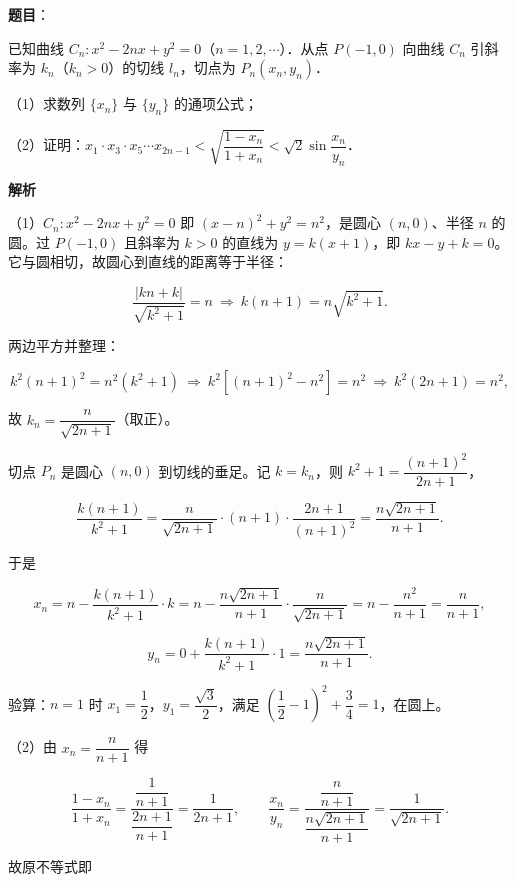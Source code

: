 \begin{answer}

\textbf{题目}：

已知曲线 $C_n:x^2-2nx+y^2=0$（$n=1,2,\cdots$）．从点 $P(-1,0)$ 向曲线 $C_n$ 引斜率为 $k_n$（$k_n>0$）的切线 $l_n$，切点为 $P_n(x_n,y_n)$．

（1）求数列 $\{x_n\}$ 与 $\{y_n\}$ 的通项公式；

（2）证明：$x_1\cdot x_3\cdot x_5\cdots x_{2n-1}<\sqrt{\dfrac{1-x_n}{1+x_n}}<\sqrt2\sin\dfrac{x_n}{y_n}$．

\textbf{解析}

（1）$C_n:x^2-2nx+y^2=0$ 即 $(x-n)^2+y^2=n^2$，是圆心 $(n,0)$、半径 $n$ 的圆。过 $P(-1,0)$ 且斜率为 $k>0$ 的直线为 $y=k(x+1)$，即 $kx-y+k=0$。它与圆相切，故圆心到直线的距离等于半径：

\nopagebreak[4]
\[\frac{|kn+k|}{\sqrt{k^2+1}}=n\ \Longrightarrow\ k(n+1)=n\sqrt{k^2+1}.\]

两边平方并整理：

\nopagebreak[4]
\[k^2(n+1)^2=n^2(k^2+1)\ \Longrightarrow\ k^2\left[(n+1)^2-n^2\right]=n^2\ \Longrightarrow\ k^2(2n+1)=n^2,\]

故 $k_n=\dfrac{n}{\sqrt{2n+1}}$（取正）。

切点 $P_n$ 是圆心 $(n,0)$ 到切线的垂足。记 $k=k_n$，则 $k^2+1=\dfrac{(n+1)^2}{2n+1}$，

\nopagebreak[4]
\[\frac{k(n+1)}{k^2+1}=\frac{n}{\sqrt{2n+1}}\cdot(n+1)\cdot\frac{2n+1}{(n+1)^2}=\frac{n\sqrt{2n+1}}{n+1}.\]

于是

\nopagebreak[4]
\[x_n=n-\frac{k(n+1)}{k^2+1}\cdot k=n-\frac{n\sqrt{2n+1}}{n+1}\cdot\frac{n}{\sqrt{2n+1}}=n-\frac{n^2}{n+1}=\frac{n}{n+1},\]

\nopagebreak[4]
\[y_n=0+\frac{k(n+1)}{k^2+1}\cdot1=\frac{n\sqrt{2n+1}}{n+1}.\]

验算：$n=1$ 时 $x_1=\dfrac12$，$y_1=\dfrac{\sqrt3}{2}$，满足 $\left(\dfrac12-1\right)^2+\dfrac34=1$，在圆上。

（2）由 $x_n=\dfrac{n}{n+1}$ 得

\nopagebreak[4]
\[\frac{1-x_n}{1+x_n}=\frac{\dfrac1{n+1}}{\dfrac{2n+1}{n+1}}=\frac1{2n+1},\qquad \frac{x_n}{y_n}=\frac{\dfrac{n}{n+1}}{\dfrac{n\sqrt{2n+1}}{n+1}}=\frac1{\sqrt{2n+1}}.\]

故原不等式即


\end{answer}
